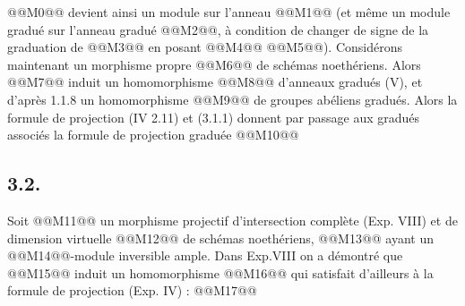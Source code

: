 
@@M0@@
devient ainsi un module sur l'anneau @@M1@@ (et même un module gradué sur l'anneau gradué @@M2@@, à condition de changer de signe de la graduation de @@M3@@ en posant @@M4@@ @@M5@@).
Considérons maintenant un morphisme propre
@@M6@@
de schémas noethériens. Alors @@M7@@ induit un homomorphisme
@@M8@@
d'anneaux gradués (V), et d'après 1.1.8 un homomorphisme
@@M9@@
de groupes abéliens gradués. Alors la formule de projection (IV 2.11) et (3.1.1) donnent par passage aux gradués associés la formule de projection graduée
@@M10@@

\subsection*{3.2.}
Soit @@M11@@ un morphisme projectif d'intersection complète (Exp. VIII) et de dimension virtuelle @@M12@@ de schémas noethériens, @@M13@@ ayant un @@M14@@-module inversible ample. Dans Exp.VIII on a démontré que @@M15@@ induit un homomorphisme
@@M16@@
qui satisfait d'ailleurs à la formule de projection (Exp. IV) :
@@M17@@
